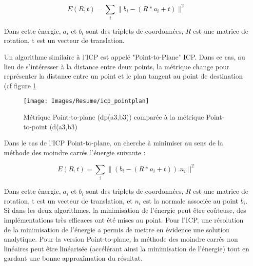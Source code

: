 \begin{equation}
E(R,t) = \sum_{i}\|b_{i}-(R*a_{i} + t)\|^{2}
\end{equation}

Dans cette énergie, $a_{i}$ et $b_{i}$ sont des triplets de coordonnées, $R$ est une matrice de rotation, t est un vecteur de translation.

Un algorithme similaire à l'ICP est appelé "Point-to-Plane" ICP. Dans ce cas, au lieu de s'intéresser à la distance entre deux points, la métrique change pour représenter la distance entre un point et le plan tangent au point de destination (cf figure \ref{fig_pointtoplane}

\begin{figure}[H]
\centering
\texttt{[image: Images/Resume/icp\_pointplan]}
\caption{Métrique Point-to-plane (dp(a3,b3)) comparée à la métrique Point-to-point (d(a3,b3)}
\label{fig_pointtoplane}
\end{figure}

Dans le cas de l'ICP Point-to-plane, on cherche à minimiser au sens de la méthode des moindre carrés l'énergie suivante :

\begin{equation}
E(R,t) = \sum_{i} \|(b_{i}-(R*a_{i} + t)).n_{i}\|^{2}
\end{equation}	

Dans cette énergie, $a_{i}$ et $b_{i}$ sont des triplets de coordonnées, $R$ est une matrice de rotation, t est un vecteur de translation, et $n_{i}$ est la normale associée au point $b_{i}$.\\

Si dans les deux algorithmes, la minimisation de l'énergie peut être coûteuse, des implémentations très efficaces ont été mises au point. Pour l'ICP, une résolution de la minimisation de l'énergie a permis de mettre en évidence une solution analytique. Pour la version Point-to-plane, la méthode des moindre carrés non linéaires peut être linéarisée (accélérant ainsi la minimisation de l'énergie) tout en gardant une bonne approximation du résultat.
